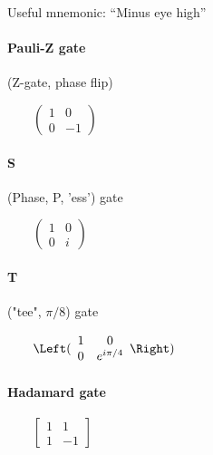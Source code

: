 \documentclass[article,pagebackref]{bespoke5}
\begin{document}
Useful mnemonic: ``Minus eye high''

\paragraph{Pauli-Z gate} (Z-gate, phase flip)

\begin{center}

%
$\qquad\left(\begin{array}{rr}1 & 0 \\ 0 & -1 \end{array}\right)$
\end{center}

\paragraph{S} (Phase, P, 'ess') gate

\begin{center}

%
$\qquad\left(\begin{array}{rr}1 & 0 \\ 0 & i \end{array}\right)$
\end{center}

\paragraph{T} ("tee", $\pi/8$) gate

\begin{center}

%
$\qquad\Left(\begin{array}{cc}1 & 0 \\ 0 & e^{i \pi/4} \end{array}\Right)$
\end{center}



\paragraph{Hadamard gate}

\begin{center}

%
$\qquad\begin{bmatrix}1 & 1 \\ 1 & -1 \end{bmatrix}$
\end{center}



$$

$$
\end{document}
